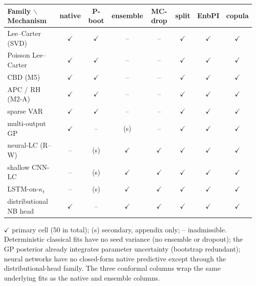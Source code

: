 \begin{threeparttable}\small\setlength{\tabcolsep}{4.5pt}
\begin{tabular}{@{}lccccccc@{}}
\toprule
Family $\backslash$ Mechanism & native & P-boot & ensemble & MC-drop & split & EnbPI & copula \\
\midrule
Lee--Carter (SVD)          & $\checkmark$ & $\checkmark$ & --  & --  & $\checkmark$ & $\checkmark$ & $\checkmark$ \\
Poisson Lee--Carter        & $\checkmark$ & $\checkmark$ & --  & --  & $\checkmark$ & $\checkmark$ & $\checkmark$ \\
CBD (M5)                   & $\checkmark$ & $\checkmark$ & --  & --  & $\checkmark$ & $\checkmark$ & $\checkmark$ \\
APC / RH (M2-A)            & $\checkmark$ & $\checkmark$ & --  & --  & $\checkmark$ & $\checkmark$ & $\checkmark$ \\
sparse VAR                 & $\checkmark$ & $\checkmark$ & --  & --  & $\checkmark$ & $\checkmark$ & $\checkmark$ \\
multi-output GP            & $\checkmark$ & --  & (s) & --  & $\checkmark$ & $\checkmark$ & $\checkmark$ \\
neural-LC (R--W)           & --  & (s) & $\checkmark$ & $\checkmark$ & $\checkmark$ & $\checkmark$ & $\checkmark$ \\
shallow CNN-LC             & --  & (s) & $\checkmark$ & $\checkmark$ & $\checkmark$ & $\checkmark$ & $\checkmark$ \\
LSTM-on-$\kappa_t$         & --  & (s) & $\checkmark$ & $\checkmark$ & $\checkmark$ & $\checkmark$ & $\checkmark$ \\
distributional NB head     & $\checkmark$ & --  & $\checkmark$ & $\checkmark$ & $\checkmark$ & $\checkmark$ & $\checkmark$ \\
\bottomrule
\end{tabular}
\begin{tablenotes}\footnotesize
\item $\checkmark$ primary cell (50 in total); (s) secondary, appendix only; -- inadmissible.
Deterministic classical fits have no seed variance (no ensemble or dropout);
the GP posterior already integrates parameter uncertainty (bootstrap
redundant); neural networks have no closed-form native predictive except
through the distributional-head family. The three conformal columns wrap the
same underlying fits as the native and ensemble columns.
\end{tablenotes}
\end{threeparttable}

